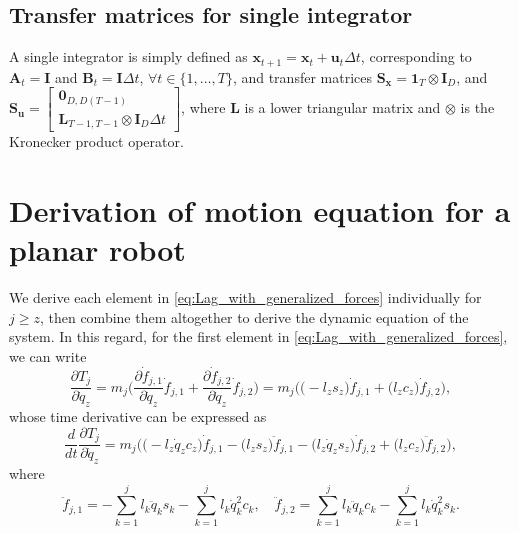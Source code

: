\documentclass[10pt,a4paper]{article} %
\begin{document}
\subsection*{Transfer matrices for single integrator}

A single integrator is simply defined as $\bm{x}_{t+1} = \bm{x}_t + \bm{u}_t \Delta t$, corresponding to $\bm{A}_t=\bm{I}$ and $\bm{B}_t=\bm{I}\Delta t$, $\forall t\in\{1,\ldots,T\}$, and transfer matrices $\bm{S}_{\bm{x}} = \bm{1}_T \otimes \bm{I}_D$, and $\bm{S}_{\bm{u}} = \begin{bmatrix} \bm{0}_{D,D(T\!-\!1)} \\ \bm{L}_{T\!-\!1,T\!-\!1} \otimes \bm{I}_D \Delta t \end{bmatrix}$, where $\bm{L}$ is a lower triangular matrix and $\otimes$ is the Kronecker product operator. %



\section{Derivation of motion equation for a planar robot}\label{sec:FD_derivation}

We derive each element in \eqref{eq:Lag_with_generalized_forces} individually for $j \geq z$, then combine them altogether to derive the dynamic equation of the system. In this regard, for the first element in \eqref{eq:Lag_with_generalized_forces}, we can write
\begin{equation*}
	\frac{\partial T_j}{\partial \dot{q}_z} = m_j \Big(\frac{\partial \dot{f}_{j,1}}{\partial \dot{q}_z} \dot{f}_{j,1} 
	+ \frac{\partial \dot{f}_{j,2}}{\partial \dot{q}_z} \dot{f}_{j,2}\Big) =  
	 m_j \Big(\Big(- l_z s_z\Big) \dot{f}_{j,1} +\Big(l_z c_z\Big) \dot{f}_{j,2}\Big), \nonumber
\end{equation*}
whose time derivative can be expressed as
\begin{equation*}
	\frac{d}{dt} \frac{\partial T_j}{\partial \dot{q}_z} = 
	m_j \Big(\Big(- l_z \dot{q}_z c_z\Big) \dot{f}_{j,1} - \Big(l_z s_z\Big) \ddot{f}_{j,1} 
	- \Big(l_z \dot{q}_z s_z\Big) \dot{f}_{j,2} + \Big(l_z c_z\Big) \ddot{f}_{j,2}\Big),
\end{equation*}
where
\begin{equation*}
	\ddot{f}_{j,1} = -\sum_{k=1}^j l_k \ddot{q}_k s_k -\sum_{k=1}^j l_k \dot{q}_k^2 c_k,\quad
	\ddot{f}_{j,2} = \sum_{k=1}^j l_k  \ddot{q}_k c_k -\sum_{k=1}^j l_k \dot{q}_k^2 s_k.
\end{equation*}
\end{document}
